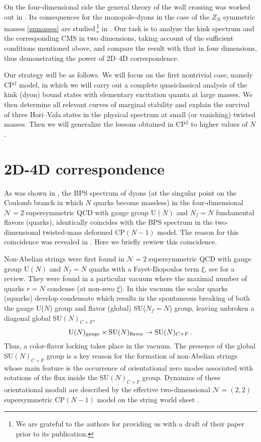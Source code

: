 \documentclass[epsfig,12pt]{article}
\def\beq{\begin{equation}}
\def\eeq{\end{equation}}
\newcommand{\ntwo}{${\mathcal N}=2\;$}
\def\beq{\begin{equation}}
\def\eeq{\end{equation}}
\newcommand{\ntwot}{${\mathcal N}= \left(2,2\right) $ }
\begin{document}
	On the four-dimensional side the general theory of the wall crossing was worked out in \cite{koso}. 
	Its consequences for the monopole-dyons in the case of the $Z_N$ symmetric masses \eqref{znmasses}
	are studied\,\footnote{We are grateful to the authors for providing us with a draft of their paper prior to its publication.}
	in \cite{ndkp}. 
	Our task is to analyze the kink spectrum and the corresponding CMS in two dimensions, 
	taking account of the sufficient conditions mentioned above, 
	and compare the result with that in four dimensions, 
	thus  demonstrating the power of 2D--4D correspondence.
	
	Our strategy will be as follows. We will focus on the first nontrivial case, namely CP$^2$ model,
	in which we will carry out a complete quasiclassical analysis of the kink (dyon) bound states   with elementary
	excitation quanta at large masses. We then determine all relevant curves of marginal stability and explain the survival of three Hori--Vafa \cite{MR1} states in the physical spectrum at small (or vanishing) twisted masses.
	Then we will generalize the lessons obtained in CP$^2$ to higher values of $N$.


\section{2D-4D correspondence}
\setcounter{equation}{0}
\label{2D4D}

As was shown in \cite{Dorey:1998yh},
the BPS spectrum of dyons (at the singular point on the Coulomb branch 
in which  $N$ quarks become massless) in the
four-dimensional \ntwo supersymmetric QCD with gauge group U$(N)$ and  $N_f=N$ fundamental flavors (quarks), identically
coincides with the BPS spectrum in the two-dimensional twisted-mass deformed CP$(N-1)$ model.
 The reason for this coincidence was revealed 
in \cite{Shifman:2004dr,4}. Here we briefly rewiew this coincidence.

Non-Abelian strings \cite{1,2} were first found in \ntwo supersymmetric QCD with gauge group U$(N)$ and  $N_f=N$ quarks with a Fayet-Iliopoulos term $\xi$, see \cite{Trev,Jrev,SYrev,Trev2} for a review.
 They were found in a 
 particular vacuum where the maximal number of quarks $r=N$ condense (at non-zero $\xi$).
In this vacuum the scalar quarks (squarks) develop condensate which results in  the spontaneous
breaking of both the gauge U($N$) group and flavor (global) SU($N_f=N$) group, leaving unbroken a
  diagonal global SU$(N)_{C+F}$,
\beq
{\rm U}(N)_{\rm gauge}\times {\rm SU}(N)_{\rm flavor}
\to {\rm SU}(N)_{C+F}\,.
\label{c+f}
\eeq
Thus, a color-flavor locking takes place in the vacuum.
The presence of the global SU$(N)_{C+F}$ group is a key reason for the
formation of non-Abelian strings whose main feature is
the occurrence  of orientational zero modes associated with rotations of the flux
inside the  SU$(N)_{C+F}$ group. Dynamics of these orientational moduli are described by
the effective two-dimensional   \ntwot supersymmetric CP$(N-1)$ model on
the string world sheet \cite{1,2,Shifman:2004dr,4}. 
\end{document}
